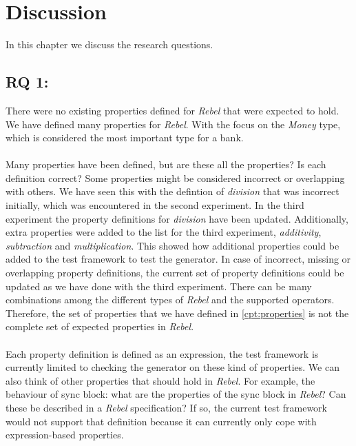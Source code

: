 \chapter{Discussion}
\label{cpt:discussion}
In this chapter we discuss the research questions.

\section{RQ 1: \rqOne{}}
There were no existing properties defined for \textit{Rebel} that were expected
to hold. We have defined many properties for \textit{Rebel}. With the focus on
the \textit{Money} type, which is considered the most important type for a
bank.\\
\\
Many properties have been defined, but are these all the properties? Is each
definition correct? Some properties might be considered incorrect or overlapping
with others. We have seen this with the defintion of \textit{division} that was
incorrect initially, which was encountered in the second experiment. In the
third experiment the property definitions for \textit{division} have been
updated. Additionally, extra properties were added to the list for the third
experiment, \textit{additivity}, \textit{subtraction} and
\textit{multiplication}. This showed how additional properties could be added to
the test framework to test the generator. In case of incorrect, missing or
overlapping property definitions, the current set of property definitions could
be updated as we have done with the third experiment. There can be many
combinations among the different types of \textit{Rebel} and the supported
operators. Therefore, the set of properties that we have defined in
\autoref{cpt:properties} is not the complete set of expected properties in
\textit{Rebel}.\\
\\
Each property definition is defined as an expression, the test framework is
currently limited to checking the generator on these kind of properties. We can also
think of other properties that should hold in \textit{Rebel}. For example, the
behaviour of sync block: what are the properties of the sync block in
\textit{Rebel}? Can these be described in a \textit{Rebel} specification? If so,
the current test framework would not support that definition because it can
currently only cope with expression-based properties.

